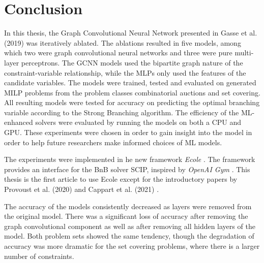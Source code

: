 \chapter{Conclusion}\label{cha:conclusion}

In this thesis, the Graph Convolutional Neural Network presented in Gasse et al. (2019) \cite{gasse2019exact} was iteratively ablated. The ablations resulted in five models, among which two were graph convolutional neural networks and three were pure multi-layer perceptrons. The \gls{GCNN} models used the bipartite graph nature of the constraint-variable relationship, while the \gls{MLP}s only used the features of the candidate variables. The models were trained, tested and evaluated on generated \gls{MILP} problems from the problem classes combinatorial auctions and set covering. All resulting models were tested for accuracy on predicting the optimal branching variable according to the Strong Branching algorithm. The efficiency of the \gls{ML}-enhanced solvers were evaluated by running the models on both a \gls{CPU} and \gls{GPU}. These experiments were chosen in order to gain insight into the model in order to help future researchers make informed choices of \gls{ML} models. 

The experiments were implemented in he new framework \textit{\gls{Ecole}} \cite{prouvost2020ecole}. The framework provides an interface for the \gls{BnB} solver \gls{SCIP}, inspired by \textit{OpenAI Gym} \cite{brockman2016openai}.  
This thesis is the first article to use \gls{Ecole} except for the introductory papers by Provoust et al. (2020) \cite{prouvost2020ecole} and Cappart et al. (2021) \cite{cappart2021combinatorial}. 

The accuracy of the models consistently decreased as layers were removed from the original model. There was a significant loss of accuracy after removing the graph convolutional component as well as after removing all hidden layers of the model. Both problem sets showed the same tendency, though the degradation of accuracy was more dramatic for the set covering problems, where there is a larger number of constraints.  


